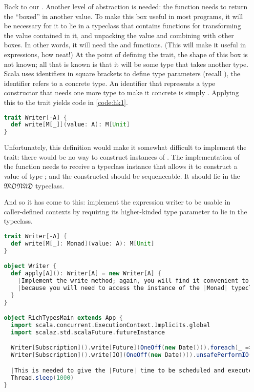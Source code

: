 \documentclass[10 pt]{article}
\begin{document}
Back to our . Another level of abstraction is needed: the  function needs to return the \pcode{()} ``boxed'' in another value. To make this box useful in most programs, it will be necessary for it to lie in a typeclass that contains functions for transforming the value contained in it, and unpacking the value and combining with other boxes. In other words, it will need the  and  functions. (This will make it useful in  expressions, how neat!) At the point of defining the  trait, the shape of this box is not known; all that is known is that it will be some type that takes another type. Scala uses identifiers in square brackets to define type parameters (recall ), the identifier  refers to a concrete type. An identifier that represents a type constructor that needs one more type to make it concrete is simply . Applying this to the  trait yields code in \autoref{code:hk1}.

\begin{lstlisting}[caption={Defining and using higher-kinded types}, label={code:hk1}, language=Scala, escapechar=|]
trait Writer[-A] {
  def write[M[_]](value: A): M[Unit]
}
\end{lstlisting}

Unfortunately, this definition would make it somewhat difficult to implement the trait: there would be no way to construct instances of . The implementation of the  function needs to receive a typeclass instance that allows it to construct a value of type ; and the constructed  should be sequenceable. It should lie in the $\mathfrak{MONAD}$ typeclass. 

\begin{example}
And so it has come to this: implement the expression writer to be usable in caller-defined contexts by requiring its higher-kinded type parameter  to lie in the  typeclass.

\begin{lstlisting}[caption={Reader and Writer with proper variance}, label={code:rw2}, language=Scala, escapechar=|]
trait Writer[-A] {
  def write[M[_]: Monad](value: A): M[Unit]
}

object Writer {
  def apply[A](): Writer[A] = new Writer[A] {
    |Implement the write method; again, you will find it convenient to use the full implicit syntax,|
    |because you will need to access the instance of the |Monad| typeclass for the [higher-kinded] type |M|.|
  }
}

object RichTypesMain extends App {
  import scala.concurrent.ExecutionContext.Implicits.global
  import scalaz.std.scalaFuture.futureInstance

  Writer[Subscription]().write[Future](OneOff(new Date())).foreach(_ => println("Done"))
  Writer[Subscription]().write[IO](OneOff(new Date())).unsafePerformIO()

  |This is needed to give the |Future| time to be scheduled and executed.|
  Thread.sleep(1000)
}
\end{lstlisting}
\end{example}
\end{document}
